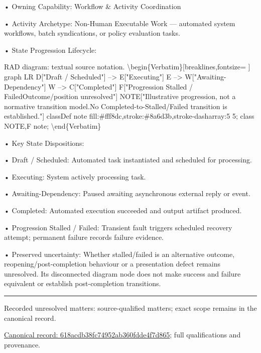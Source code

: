 •
Owning Capability: Workflow \& Activity Coordination



•
Activity Archetype: Non-Human Executable Work — automated system workflows, batch syndications, or policy evaluation tasks.



•
State Progression Lifecycle:



RAD diagram: textual source notation.
\textbackslash{}begin\{Verbatim\}[breaklines,fontsize=
]
graph LR
    D["Draft / Scheduled"] --> E["Executing"]
    E --> W["Awaiting-Dependency"]
    W --> C["Completed"]
    F["Progression Stalled / Failed\newline{}Outcome/position unresolved"]
    NOTE["Illustrative progression, not a normative transition model.\newline{}No Completed-to-Stalled/Failed transition is established."]
    classDef note fill:\#fff8dc,stroke:\#8a6d3b,stroke-dasharray:5 5;
    class NOTE,F note;
\textbackslash{}end\{Verbatim\}



•
Key State Dispositions:



•
Draft / Scheduled: Automated task instantiated and scheduled for processing.



•
Executing: System actively processing task.



•
Awaiting-Dependency: Paused awaiting asynchronous external reply or event.



•
Completed: Automated execution succeeded and output artifact produced.



•
Progression Stalled / Failed: Transient fault triggers scheduled recovery attempt; permanent failure records failure evidence.



•
Preserved uncertainty: Whether stalled/failed is an alternative outcome, reopening/post-completion behaviour or a presentation defect remains unresolved. Its disconnected diagram node does not make success and failure equivalent or establish post-completion transitions.



\medskip\hrule\medskip

{\small Recorded unresolved matters: source-qualified matters; exact scope remains in the canonical record.}\par
{\footnotesize \href{../../../../../../../../continuum/business/business-process/618acdb38fc74952ab360fdde4f7d865.md}{Canonical record: 618acdb38fc74952ab360fdde4f7d865}; full qualifications and provenance.}\par
